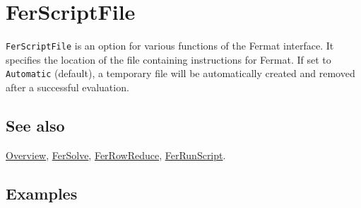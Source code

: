 \documentclass[../FeynHelpersManual.tex]{subfiles}
\begin{document}
\hypertarget{ferscriptfile}{
\section{FerScriptFile}\label{ferscriptfile}}

\texttt{FerScriptFile} is an option for various functions of the Fermat
interface. It specifies the location of the file containing instructions
for Fermat. If set to \texttt{Automatic} (default), a temporary file
will be automatically created and removed after a successful evaluation.

\subsection{See also}

\hyperlink{toc}{Overview}, \hyperlink{fersolve}{FerSolve},
\hyperlink{ferrowreduce}{FerRowReduce},
\hyperlink{ferrunscript}{FerRunScript}.

\subsection{Examples}
\end{document}
